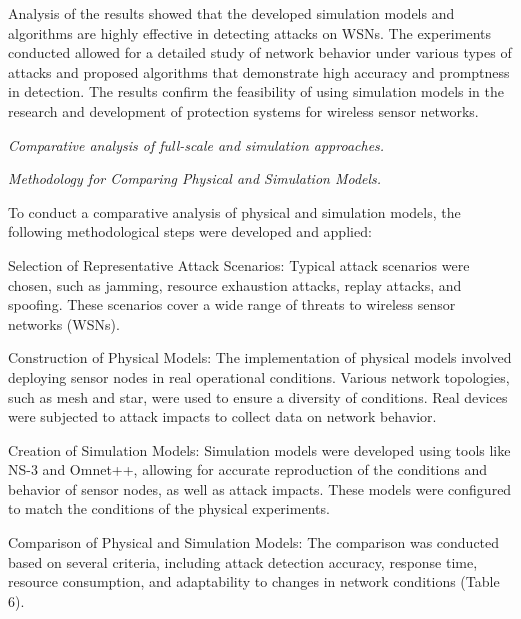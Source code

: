 \begin{multicols}{2}

Analysis of the results showed that the developed simulation models and
algorithms are highly effective in detecting attacks on WSNs. The
experiments conducted allowed for a detailed study of network behavior
under various types of attacks and proposed algorithms that demonstrate
high accuracy and promptness in detection. The results confirm the
feasibility of using simulation models in the research and development
of protection systems for wireless sensor networks.

\emph{Comparative analysis of full-scale and simulation approaches.}

\emph{Methodology for Comparing Physical and Simulation Models.}

To conduct a comparative analysis of physical and simulation models, the
following methodological steps were developed and applied:

Selection of Representative Attack Scenarios: Typical attack scenarios
were chosen, such as jamming, resource exhaustion attacks, replay
attacks, and spoofing. These scenarios cover a wide range of threats to
wireless sensor networks (WSNs).

Construction of Physical Models: The implementation of physical models
involved deploying sensor nodes in real operational conditions. Various
network topologies, such as mesh and star, were used to ensure a
diversity of conditions. Real devices were subjected to attack impacts
to collect data on network behavior.

Creation of Simulation Models: Simulation models were developed using
tools like NS-3 and Omnet++, allowing for accurate reproduction of the
conditions and behavior of sensor nodes, as well as attack impacts.
These models were configured to match the conditions of the physical
experiments.

Comparison of Physical and Simulation Models: The comparison was
conducted based on several criteria, including attack detection
accuracy, response time, resource consumption, and adaptability to
changes in network conditions (Table 6).
\end{multicols}

\newpage


